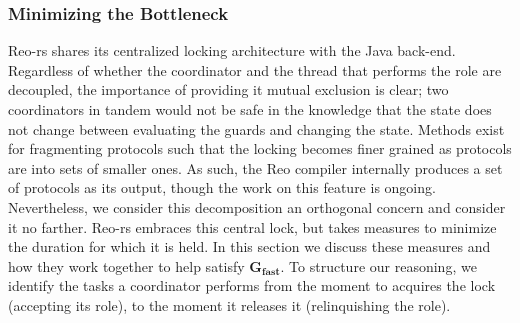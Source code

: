 \subsubsection{Minimizing the Bottleneck}
\label{sec:minimizing_the_bottleneck}
Reo-rs shares its centralized locking architecture with the Java back-end. Regardless of whether the coordinator and the thread that performs the role are decoupled, the importance of providing it mutual exclusion is clear; two coordinators in tandem would not be safe in the knowledge that the state does not change between evaluating the guards and changing the state. Methods exist for fragmenting protocols such that the locking becomes finer grained as protocols are into sets of smaller ones. As such, the Reo compiler internally produces a set of protocols as its output, though the work on this feature is ongoing. Nevertheless, we consider this decomposition an orthogonal concern and consider it no farther. Reo-rs embraces this central lock, but takes measures to minimize the duration for which it is held. In this section we discuss these measures and how they work together to help satisfy $\boldsymbol{G_{fast}}$. To structure our reasoning, we identify the tasks a coordinator performs from the moment to acquires the lock (accepting its role), to the moment it releases it (relinquishing the role). 

